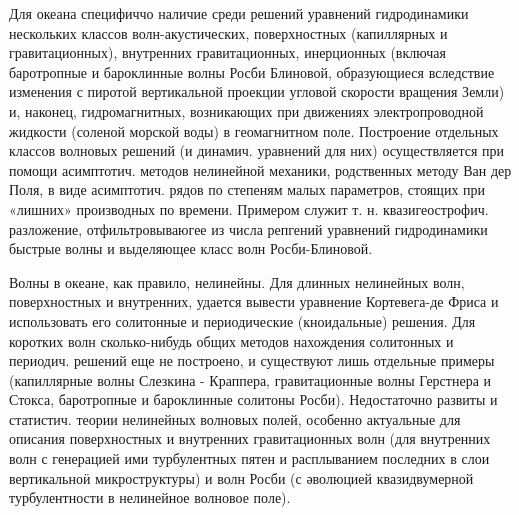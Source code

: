 \documentclass[10pt]{article}
\begin{document}
Для океана специфиччо наличие среди решений уравнений гидродинамики нескольких классов волн-акустических, поверхностных (капиллярных и гравитационных), внутренних гравитационных, инерционных (включая баротропные и бароклинные волны Росби Блиновой, образующиеся вследствие изменения с пиротой вертикальной проекции угловой скорости вращения Земли) и, наконец, гидромагнитных, возникающих при движениях электропроводной жидкости (соленой морской воды) в геомагнитном поле. Построение отдельных классов волновых решений (и динамич. уравнений для них) осуществляется при помощи асимптотич. методов нелинейной механики, родственных методу Ван дер Поля, в виде асимптотич. рядов по степеням малых параметров, стоящих при «лишних» производных по времени. Примером служит т. н. квазигеострофич. разложение, отфильтровываюгее из числа репгений уравнений гидродинамики быстрые волны и выделяющее класс волн Росби-Блиновой.



Волны в океане, как правило, нелинейны. Для длинных нелинейных волн, поверхностных и внутренних, удается вывести уравнение Кортевега-де Фриса и использовать его солитонные и периодические (кноидальные) решения. Для коротких волн сколько-нибудь общих методов нахождения солитонных и периодич. решений еще не построено, и существуют лишь отдельные примеры (капиллярные волны Слезкина - Краппера, гравитационные волны Герстнера и Стокса, баротропные и бароклинные солитоны Росби). Недостаточно развиты и статистич. теории нелинейных волновых полей, особенно актуальные для описания поверхностных и внутренних гравитационных волн (для внутренних волн с генерацией ими турбулентных пятен и расплыванием последних в слои вертикальноӥ микроструктуры) и волн Росби (с әволюцией квазидвумерной турбулентности в нелинейное волновое поле).
\end{document}
